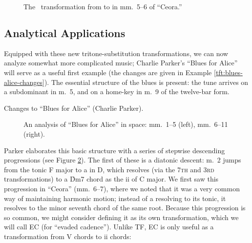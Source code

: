 \begin{figure}[htbp]
  \caption{The \slideS\ transformation from \protect{} to
    \protect{} in mm.~5--6 of ``Ceora.''}
  \label{tft:slide7-ceora}
\end{figure}




\subsection{Analytical Applications}

Equipped with these new tritone-substitution transformations, we can now
analyze somewhat more complicated music; Charlie Parker’s “Blues for Alice”
will serve as a useful first example (the changes are given in Example
\ref{tft:blues-alice-changes}). The essential structure of the blues is
present: the tune arrives on a subdominant in m.~5, and on a home-key \tf in
m.~9 of the twelve-bar form.

\begin{example}[tbp]
  \caption{Changes to ``Blues for Alice'' (Charlie Parker).}
  \label{tft:blues-alice-changes}
\end{example}

\begin{figure}[tbp]
  \caption[An analysis of ``Blues for Alice'' in \tf space]{An analysis of
    ``Blues for Alice'' in \tf space: mm.~1--5 (left), mm.~6--11 (right).}
  \label{tft:blues-alice-space}
\end{figure}


Parker elaborates this basic structure with a series of stepwise descending
\tf progressions (see Figure \ref{tft:blues-alice-space}). The first of
these is a diatonic descent: m.~2 jumps from the tonic F  major to a \tf in D,
which resolves (via the \textsc{7th} and \textsc{3rd} transformations) to a
\h{Dm7} chord as the ii of C major. We first saw this progression in
``Ceora'' (mm.~6--7), where we noted that it was a very common way of
maintaining harmonic motion; instead of a \tf resolving to its tonic, it resolves
to the minor seventh chord of the same root. Because this progression is so
common, we might consider defining it as its own transformation, which we will
call EC (for ``evaded cadence''). Unlike TF, EC is only useful as a
transformation from V chords to ii chords:

